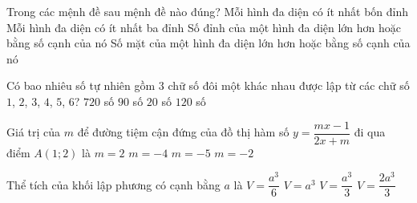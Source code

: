 \begin{ex}%
	Trong các mệnh đề sau mệnh đề nào đúng?
	\choice
	 {\True Mỗi hình đa diện có ít nhất bốn đỉnh}
	 {Mỗi hình đa diện có ít nhất ba đỉnh}
	 {Số đỉnh của một hình đa diện lớn hơn hoặc bằng số cạnh của nó}
	 {Số mặt của một hình đa diện lớn hơn hoặc bằng số cạnh của nó}
\end{ex}


\begin{ex}%
	Có bao nhiêu số tự nhiên gồm $3$ chữ số đôi một khác nhau được lập từ các chữ số $1$, $2$, $3$, $4$, $5$, $6$?
	\choice
	 {$720$ số}
	 {$90$ số}
	 {$20$ số}
	 {\True $120$ số}
\end{ex}


\begin{ex}%
	 Giá trị của $m$ để đường tiệm cận đứng của đồ thị hàm số $y=\dfrac{m x-1}{2x+m}$ đi qua điểm $A(1 ; 2)$ là
	 \choice
	 {$m=2$}
	 {$m=-4$}
	 {$m=-5$}
	 {\True $m=-2$}
\end{ex}


\begin{ex}%
	Thể tích của khối lập phương có cạnh bằng $a$ là
	\choice
	{ $V=\dfrac{a^3}6$}
	 {\True $V=a^3$}
	 {$V=\dfrac{a^3}3$}
	 {$V=\dfrac{2a^3}3$}
\end{ex}


